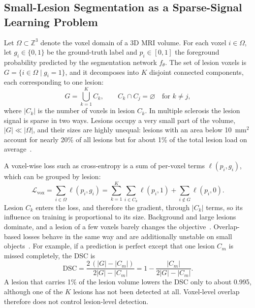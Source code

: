 \subsection{Small-Lesion Segmentation as a Sparse-Signal Learning Problem}
\label{sec:problem}

Let $\Omega \subset \mathbb{Z}^{3}$ denote the voxel domain of a 3D MRI
volume. For each voxel $i \in \Omega$, let $g_i \in \{0,1\}$ be the
ground-truth label and $p_i \in [0,1]$ the foreground probability predicted
by the segmentation network $f_{\theta}$. The set of lesion voxels is
$G = \{ i \in \Omega \mid g_i = 1 \}$, and it decomposes into $K$ disjoint
connected components, each corresponding to one lesion:
\begin{equation}
G = \bigcup_{k=1}^{K} C_k,
\qquad
C_k \cap C_j = \varnothing \quad \text{for } k \neq j ,
\end{equation}
where $|C_k|$ is the number of voxels in lesion $C_k$. In multiple
sclerosis the lesion signal is sparse in two ways. Lesions occupy a very
small part of the volume, $|G| \ll |\Omega|$, and their sizes are highly
unequal: lesions with an area below 10~mm$^2$ account for nearly 20\% of
all lesions but for about 1\% of the total lesion load on
average~\cite{wang_survey_1997}.

A voxel-wise loss such as cross-entropy is a sum of per-voxel terms
$\ell(p_i, g_i)$, which can be grouped by lesion:
\begin{equation}
\mathcal{L}_{\mathrm{vox}}
=
\sum_{i \in \Omega} \ell(p_i, g_i)
=
\sum_{k=1}^{K} \sum_{i \in C_k} \ell(p_i, 1)
+
\sum_{i \notin G} \ell(p_i, 0) .
\label{eq:sl_voxel_loss}
\end{equation}
Lesion $C_k$ enters the loss, and therefore the gradient, through $|C_k|$
terms, so its influence on training is proportional to its size.
Background and large lesions dominate, and a lesion of a few voxels barely
changes the objective~\cite{kofler_blob_2023}. Overlap-based losses behave
in the same way and are additionally unstable on small
objects~\cite{azad_loss_2023}. For example, if a prediction is perfect
except that one lesion $C_m$ is missed completely, the DSC is
\begin{equation}
\mathrm{DSC}
=
\frac{2\,(|G| - |C_m|)}{2|G| - |C_m|}
=
1 - \frac{|C_m|}{2|G| - |C_m|} .
\label{eq:sl_missed_lesion}
\end{equation}
A lesion that carries 1\% of the lesion volume lowers the DSC only to
about 0.995, although one of the $K$ lesions has not been detected at all.
Voxel-level overlap therefore does not control lesion-level detection.

